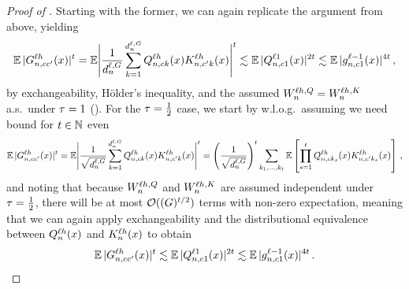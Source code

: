 \begin{proof}[Proof of ]
    Starting with the former, we can again replicate the argument from above, yielding
    \begin{align*}
        \operatorname*{\mathbb{E}} |
            G_{n, c c'}^{\ell h} (x)
        |^t
        =
        \operatorname*{\mathbb{E}}  \Biggl|
            \frac{1}{d_{n}^{\ell, G}}
            \sum_{k = 1}^{d_{n}^{\ell, G}}
                Q_{n , c k}^{\ell h} (x)
                K_{n, c' k}^{\ell h} (x)
        \Biggr|^{t}
        \lesssim
        \operatorname*{\mathbb{E}} |
            Q_{n , c 1}^{\ell 1} (x)
        |^{2t}
        \lesssim
        \operatorname*{\mathbb{E}} |
            {g}^{\ell - 1}_{n, c 1}{(x)}
        |^{4t}
        \, ,
    \end{align*}
    by exchangeability, H{\" o}lder's inequality, and the assumed $W_{n}^{\ell h, Q} = W_{n}^{\ell h, K}$ a.s.\ under $\tau = 1$ ().
    For the $\tau = \frac{1}{2}$ case, we start by w.l.o.g.\ assuming we need bound for $t \in \mathbb{N}$ even
    \begin{align*}
        \operatorname*{\mathbb{E}} |
            G_{n, c c'}^{\ell h} (x)
        |^{t}
        =
        \operatorname*{\mathbb{E}}  \Biggl|
            \frac{1}{\sqrt{d_{n}^{\ell, G}}}
            \sum_{k = 1}^{d_{n}^{\ell, G}}
                Q_{n , c k}^{\ell h} (x)
                K_{n, c' k}^{\ell h} (x)
        \Biggr|^{t}
        =
        \left(\frac{1}{\sqrt{d_{n}^{\ell, G}}}\right)^t
        \sum_{k_1, \ldots, k_t}
        \operatorname*{\mathbb{E}} \left[
            \prod_{s=1}^{t}
            Q_{n , c k_s}^{\ell h} (x)
            K_{n, c' k_s}^{\ell h} (x)
        \right]
        \, ,
    \end{align*}
    and noting that because $W_{n}^{\ell h, Q}$ and $W_{n}^{\ell h, K}$ are assumed independent under $\tau = \frac{1}{2}$, there will be at most $\mathcal{O} ( (G)^{t / 2} )$ terms with non-zero expectation, meaning that we can again apply exchangeability and the distributional equivalence between $Q_{n}^{\ell h}(x)$ and $K_{n}^{\ell h}(x)$ to obtain
    \begin{equation*}
        \operatorname*{\mathbb{E}} |
            G_{n, c c'}^{\ell h} (x)
        |^{t}
        \lesssim
        \operatorname*{\mathbb{E}} |
            Q_{n , c 1}^{\ell 1} (x)
        |^{2t}
        \lesssim
        \operatorname*{\mathbb{E}} |
            {g}^{\ell - 1}_{n, c 1}{(x)}
        |^{4t}
        \, .
    \end{equation*}
    

\end{proof}

